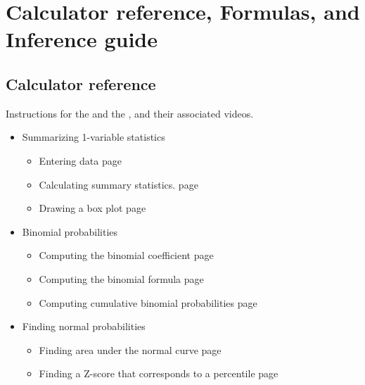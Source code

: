 \chapter{Calculator reference, Formulas, and Inference guide}

\newpage

\vspace{-55mm}

\section{Calculator reference}
\label{calculatorIndex}
Instructions for the  and the , and their associated videos.

\begin{itemize}
\item[]  Summarizing 1-variable statistics 

\begin{itemize}\vspace{-1mm}
\setlength{\itemsep}{0mm}
\item[] Entering data \hfill page~\pageref{summarizedata}
\item[] Calculating summary statistics. \hfill page~\pageref{summstat}
\item[] Drawing a box plot \hfill page~\pageref{boxplot}
\end{itemize}

\item[] Binomial probabilities
\begin{itemize}\vspace{-1mm}
\setlength{\itemsep}{0mm}
\item[] Computing the binomial coefficient \hfill page~\pageref{calculatorBinomial}
\item[] Computing the binomial formula \hfill page~\pageref{binomialformula}
\item[] Computing cumulative binomial probabilities \hfill page~\pageref{binomialcumulative}
\end{itemize}

\item[] Finding normal probabilities
\begin{itemize}\vspace{-1mm}
\setlength{\itemsep}{0mm}
\item[] Finding area under the normal curve  \hfill page~\pageref{normal}
\item[] Finding a Z-score that corresponds to a percentile  \hfill page~\pageref{invNorm}
\end{itemize}



\end{itemize}
